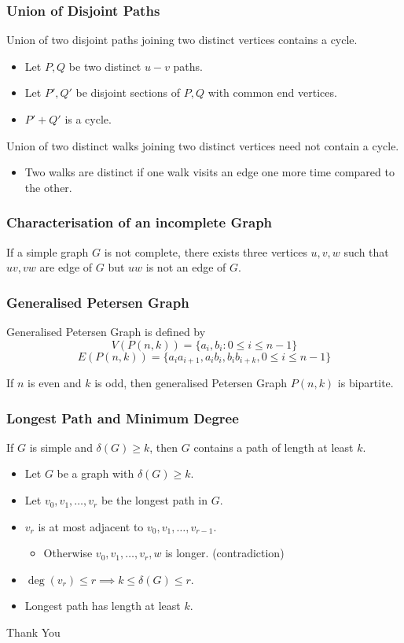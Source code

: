 \documentclass{beamer}
\begin{document}
\begin{frame}
\frametitle{Union of Disjoint Paths}
	Union of two disjoint paths joining two distinct vertices contains a cycle.
\begin{itemize}
	\item Let $P,Q$ be two distinct $u-v$ paths.
	\item Let $P', Q'$ be disjoint sections of $P,Q$ with common end vertices.
	\item $P'+Q'$ is a cycle.
\end{itemize}
	Union of two distinct walks joining two distinct vertices need not contain a cycle.
\begin{itemize}
	\item Two walks are distinct if one walk visits an edge one more time compared to the other.
\end{itemize}
\end{frame}

\begin{frame}
\frametitle{Characterisation of an incomplete Graph}
		If a simple graph $G$ is not complete, there exists three vertices $u,v,w$ such that $uv,vw$ are edge of $G$ but $uw$ is not an edge of $G$.
\end{frame}

\begin{frame}
\frametitle{Generalised Petersen Graph}
	\begin{definition}
	Generalised Petersen Graph is defined by
		$$ V(P(n,k)) = \{ a_i,b_i : 0 \le i \le n-1 \}  $$
		$$ E(P(n,k)) = \{ a_ia_{i+1}, a_ib_i, b_ib_{i+k}, 0 \le i \le n-1 \} $$
	\end{definition}
	
		If $n$ is even and $k$ is odd, then generalised Petersen Graph $P(n,k)$ is bipartite.
\end{frame}

\begin{frame}
\frametitle{Longest Path and Minimum Degree}
	If $G$ is simple and $\delta(G) \ge k$, then $G$ contains a path of length at least $k$.
\begin{itemize}
	\item Let $G$ be a graph with $\delta(G) \ge k$.
	\item Let $v_0,v_1,\dots,v_r$ be the longest path in $G$.
	\item $v_r$ is at most adjacent to $v_0,v_1,\dots, v_{r-1}$.
	\begin{itemize}
		\item Otherwise $v_0,v_1,\dots,v_r,w$ is longer. (contradiction)
	\end{itemize}
	\item $\deg(v_r) \le r \implies k \le \delta(G) \le r$.
	\item Longest path has length at least $k$.
\end{itemize}
\end{frame}

\begin{frame}
	\vspace{0.6in}
	\hspace{3cm} {\color{blue}\Huge{Thank You}}
\end{frame}
\end{document}
